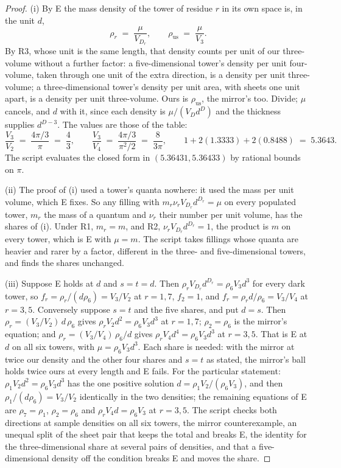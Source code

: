 \documentclass[11pt]{article}
\theoremstyle{definition}
\begin{document}
\begin{proof}
(i) By E the mass density of the tower of residue $r$ in its own space is, in the unit $d$,
\[
\rho_{r} \;=\; \frac{\mu}{V_{D_{r}}}, \qquad \rho_{\mathrm{us}} \;=\; \frac{\mu}{V_{3}}.
\]
By R3, whose unit is the same length, that density counts per unit of our three-volume without a further factor: a five-dimensional tower's density per unit four-volume, taken through one unit of the extra direction, is a density per unit three-volume; a three-dimensional tower's density per unit area, with sheets one unit apart, is a density per unit three-volume. Ours is $\rho_{\mathrm{us}}$, the mirror's too. Divide; $\mu$ cancels, and $d$ with it, since each density is $\mu/(V_{D}d^{D})$ and the thickness supplies $d^{D-3}$. The values are those of the table:
\[
\frac{V_{3}}{V_{2}} \;=\; \frac{4\pi/3}{\pi} \;=\; \frac{4}{3}, \qquad
\frac{V_{3}}{V_{4}} \;=\; \frac{4\pi/3}{\pi^{2}/2} \;=\; \frac{8}{3\pi}, \qquad
1 + 2(1.3333) + 2(0.8488) \;=\; 5.3643 .
\]
The script evaluates the closed form in $(5.36431, 5.36433)$ by rational bounds on $\pi$.

(ii) The proof of (i) used a tower's quanta nowhere: it used the mass per unit volume, which E fixes. So any filling with $m_{r}\nu_{r}V_{D_{r}}d^{D_{r}} = \mu$ on every populated tower, $m_{r}$ the mass of a quantum and $\nu_{r}$ their number per unit volume, has the shares of (i). Under R1, $m_{r} = m$, and R2, $\nu_{r}V_{D_{r}}d^{D_{r}} = 1$, the product is $m$ on every tower, which is E with $\mu = m$. The script takes fillings whose quanta are heavier and rarer by a factor, different in the three- and five-dimensional towers, and finds the shares unchanged.

(iii) Suppose E holds at $d$ and $s = t = d$. Then $\rho_{r}V_{D_{r}}d^{D_{r}} = \rho_{6}V_{3}d^{3}$ for every dark tower, so $f_{r} = \rho_{r}/(d\rho_{6}) = V_{3}/V_{2}$ at $r = 1, 7$, $f_{2} = 1$, and $f_{r} = \rho_{r}d/\rho_{6} = V_{3}/V_{4}$ at $r = 3, 5$. Conversely suppose $s = t$ and the five shares, and put $d = s$. Then $\rho_{r} = (V_{3}/V_{2})\,d\,\rho_{6}$ gives $\rho_{r}V_{2}d^{2} = \rho_{6}V_{3}d^{3}$ at $r = 1, 7$; $\rho_{2} = \rho_{6}$ is the mirror's equation; and $\rho_{r} = (V_{3}/V_{4})\,\rho_{6}/d$ gives $\rho_{r}V_{4}d^{4} = \rho_{6}V_{3}d^{3}$ at $r = 3, 5$. That is E at $d$ on all six towers, with $\mu = \rho_{6}V_{3}d^{3}$. Each share is needed: with the mirror at twice our density and the other four shares and $s = t$ as stated, the mirror's ball holds twice ours at every length and E fails. For the particular statement: $\rho_{1}V_{2}d^{2} = \rho_{6}V_{3}d^{3}$ has the one positive solution $d = \rho_{1}V_{2}/(\rho_{6}V_{3})$, and then $\rho_{1}/(d\rho_{6}) = V_{3}/V_{2}$ identically in the two densities; the remaining equations of E are $\rho_{7} = \rho_{1}$, $\rho_{2} = \rho_{6}$ and $\rho_{r}V_{4}d = \rho_{6}V_{3}$ at $r = 3, 5$. The script checks both directions at sample densities on all six towers, the mirror counterexample, an unequal split of the sheet pair that keeps the total and breaks E, the identity for the three-dimensional share at several pairs of densities, and that a five-dimensional density off the condition breaks E and moves the share.


\end{proof}
\end{document}
